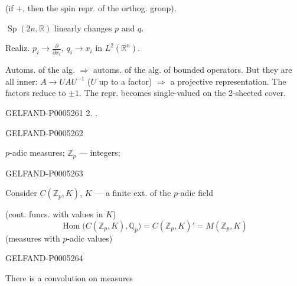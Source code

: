(if $+$, then the spin repr. of the orthog. group).

$\operatorname{Sp}(2n,\mathbb R)$ linearly changes $p$ and $q$.

Realiz.
$p_i\longrightarrow\frac{\partial}{\partial x_i}$,
$q_i\longrightarrow x_i$ in $L^2(\mathbb R^n)$.

Automs. of the alg. $\Longrightarrow$ automs. of the alg. of bounded operators.
But they are all inner: $A\longrightarrow UAU^{-1}$
($U$ up to a factor) $\Rightarrow$ a projective representation.
The factors reduce to $\pm1$.
The repr. becomes single-valued on the 2-sheeted cover.


\begin{GelfandAdjacentEvidence}{GELFAND-P000526}{1}
2. .
\end{GelfandAdjacentEvidence}
\begin{GelfandAdjacentEvidence}{GELFAND-P000526}{2}


$p$-adic measures; $\mathbb Z_p$ — integers;
\end{GelfandAdjacentEvidence}
\begin{GelfandAdjacentEvidence}{GELFAND-P000526}{3}


Consider $C(\mathbb Z_p,K)$, $K$ — a finite ext. of the $p$-adic field

(cont. funcs. with values in $K$)
\[
\operatorname{Hom}\bigl(C(\mathbb Z_p,K),\mathbb Q_p\bigr)
=C(\mathbb Z_p,K)'=M(\mathbb Z_p,K)
\]
(measures with $p$-adic values)
\end{GelfandAdjacentEvidence}
\begin{GelfandAdjacentEvidence}{GELFAND-P000526}{4}


There is a convolution on measures
\end{GelfandAdjacentEvidence}
